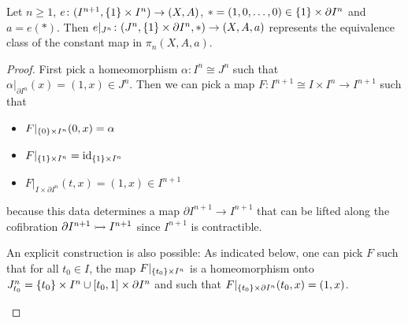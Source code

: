 \begin{lemma}\label{lem:compressionVariation}
    Let $n\geq 1$, $e\colon(I^{n+1},\left\lbrace1\right\rbrace\times I^n)\to (X,A)$, $*=(1,0,\ldots,0)\in\left\lbrace1\right\rbrace\times\partial I^n$ and $a=e(*)$. 
    Then $e|_{J^n}\colon(J^n,\left\lbrace1\right\rbrace\times\partial I^n,*)\to(X,A,a)$ represents the equivalence class of the constant map in $\pi_n(X,A,a)$.
    \begin{proof}
        First pick a homeomorphism $\alpha\colon I^n\cong J^n$ such that $\alpha|_{\partial I^n}(x)=(1,x)\in J^n$.
        Then we can pick a map $F\colon I^{n+1}\cong I\times I^n\to I^{n+1}$ such that 
        \begin{itemize}
            \item $F|_{\left\lbrace0\right\rbrace\times I^n}(0,x)=\alpha$
            \item $F|_{\left\lbrace1\right\rbrace\times I^n}=\text{id}_{\left\lbrace1\right\rbrace\times I^n}$
            \item $F|_{I\times \partial I^n}(t,x)=(1,x)\in I^{n+1}$
        \end{itemize}
        because this data determines a map $\partial I^{n+1}\to I^{n+1}$ that can be lifted along the cofibration $\partial I^{n+1}\xtailrightarrow{}I^{n+1}$ since $I^{n+1}$ is contractible.

        An explicit construction is also possible:
        As indicated below, one can pick $F$ such that for all $t_0\in I$, the map $F|_{\left\lbrace t_0\right\rbrace\times I^n}$ is a homeomorphism onto $J_{t_0}^n=\left\lbrace t_0\right\rbrace\times I^n\cup[t_0,1]\times\partial I^n$ and such that $F|_{\left\lbrace t_0\right\rbrace\times\partial I^n}(t_0,x)=(1,x)$.
        \begin{center}
\end{center}
\end{proof}
\end{lemma}
